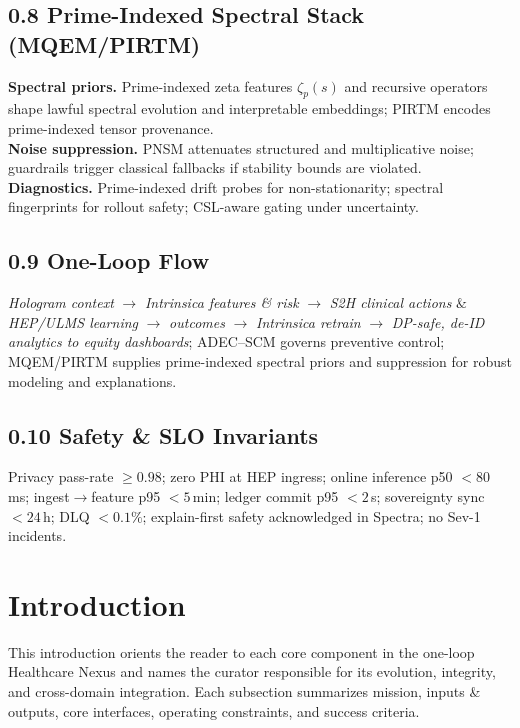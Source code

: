 \documentclass[11pt]{article}
\theoremstyle{plain}
\begin{document}
\subsection*{0.8 Prime-Indexed Spectral Stack (MQEM/PIRTM)}
\textbf{Spectral priors.} Prime-indexed zeta features $\zeta_p(s)$ and recursive operators shape lawful spectral evolution and interpretable embeddings; PIRTM encodes prime-indexed tensor provenance.\\
\textbf{Noise suppression.} PNSM attenuates structured and multiplicative noise; guardrails trigger classical fallbacks if stability bounds are violated.\\
\textbf{Diagnostics.} Prime-indexed drift probes for non-stationarity; spectral fingerprints for rollout safety; CSL-aware gating under uncertainty.

\subsection*{0.9 One-Loop Flow}
\emph{Hologram context} $\rightarrow$ \emph{Intrinsica features \& risk} $\rightarrow$ \emph{S2H clinical actions} $\&$ \emph{HEP/ULMS learning} $\rightarrow$ \emph{outcomes} $\rightarrow$ \emph{Intrinsica retrain} $\rightarrow$ \emph{DP-safe, de-ID analytics to equity dashboards}; ADEC--SCM governs preventive control; MQEM/PIRTM supplies prime-indexed spectral priors and suppression for robust modeling and explanations.

\subsection*{0.10 Safety \& SLO Invariants}
Privacy pass-rate $\ge 0.98$; zero PHI at HEP ingress; online inference p50 $<80$\,ms; ingest$\rightarrow$feature p95 $<5$\,min; ledger commit p95 $<2$\,s; sovereignty sync $<24$\,h; DLQ $<0.1\%$; explain-first safety acknowledged in Spectra; no Sev-1 incidents.


\section{Introduction}

This introduction orients the reader to each core component in the one-loop Healthcare Nexus and names the curator responsible for its evolution, integrity, and cross-domain integration. Each subsection summarizes mission, inputs \& outputs, core interfaces, operating constraints, and success criteria.
\end{document}
